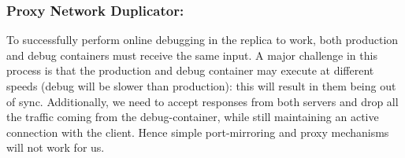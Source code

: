 \subsubsection{Proxy Network Duplicator:} 
\label{sec:parikshanProxyDuplicator}
To successfully perform online debugging in the replica to work, both production and debug containers must receive the same input.
A major challenge in this process is that the production and debug container may execute at different speeds (debug will be slower than production): this will result in them being out of sync.
Additionally, we need to accept responses from both servers and drop all the traffic coming from the debug-container, while still maintaining an active connection with the client.
Hence simple port-mirroring and proxy mechanisms will not work for us. 

